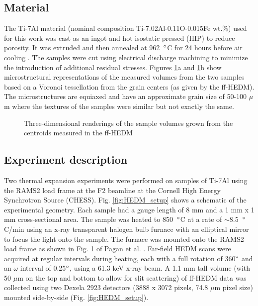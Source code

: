 \documentclass[3p]{elsarticle}
\begin{document}
	\subsection{Material}
		The Ti-7Al material (nominal composition Ti-7.02Al-0.11O-0.015Fe wt.\%) used for this work was cast as an ingot and hot isostatic pressed (HIP) to reduce porosity. It was extruded and then annealed at 962~$\degree$C for 24 hours before air cooling \cite{Pilchak2013}. The samples were cut using electrical discharge machining to minimize the introduction of additional residual stresses. Figures \ref{fig:microstructures}a and \ref{fig:microstructures}b show microstructural representations of the measured volumes from the two samples based on a Voronoi tessellation from the grain centers (as given by the f{}f-HEDM). The microstructures are equiaxed and have an approximate grain size of 50-100 $\mu$m where the textures of the samples were similar but not exactly the same.

		\begin{figure}[h!]
			\centering
			\hspace{5pt}
			\caption{ Three-dimensional renderings of the sample volumes grown from the centroids measured in the f{}f-HEDM} 
			\label{fig:microstructures}	
		\end{figure}


	\subsection{Experiment description}
		Two thermal expansion experiments were performed on samples of Ti-7Al using the RAMS2 load frame \cite{Shade2015} at the F2 beamline at the Cornell High Energy Synchrotron Source (CHESS). Fig. \ref{fig:HEDM_setup} shows a schematic of the experimental geometry. Each sample had a gauge length of 8 mm and a 1 mm x 1 mm cross-sectional area.  The sample was heated to 850~$\degree$C at a rate of $\sim$8.5~$\degree$C/min using an x-ray transparent halogen bulb furnace with an elliptical mirror to focus the light onto the sample. The furnace was mounted onto the RAMS2 load frame as shown in Fig. 1 of Pagan et al. \cite{Pagan2018}. Far-field HEDM scans were acquired at regular intervals during heating, each with a full rotation of 360$\degree$ and an $\omega$ interval of 0.25$\degree$, using a 61.3 keV x-ray beam. A 1.1 mm tall volume (with 50 $\mu$m on the top and bottom to allow for slit scattering) of f{}f-HEDM data was collected using two Dexela 2923 detectors (3888 x 3072 pixels, 74.8 $\mu$m pixel size) mounted side-by-side (Fig. \ref{fig:HEDM_setup}).
		
\end{document}
